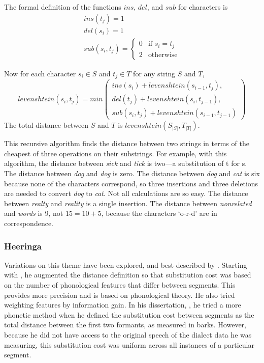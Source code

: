 \documentclass[11pt]{article}
\begin{document}
The formal definition of the functions $ins$, $del$, and $sub$
for characters is
\begin{equation}
\begin{array}{l}
   ins(t_j) = 1 \\
   del(s_i) = 1 \\
   sub(s_i,t_j) = \left\{
     \begin{array}{ll}
       0 & \textrm{if $s_i=t_j$} \\
       2 & \textrm{otherwise}
     \end{array} \right.

   \end{array}
\end{equation}

Now for each character $s_i \in S$ and $t_j \in T$ for any string $S$ and $T$,
\begin{equation}
  levenshtein(s_i,t_j) = min \left(
  \begin{array}{l}
   ins(s_i)+levenshtein(s_{i-1},t_j), \\
 del(t_j)+levenshtein(s_i,t_{j-1}), \\
 sub(s_i,t_j)+levenshtein(s_{i-1},t_{j-1})
   \end{array} \right)
   \label{levequation}
\end{equation}
The total distance between $S$ and $T$ is $levenshtein(S_{|S|},T_{|T|})$.

This recursive algorithm finds the distance between two strings in
terms of the cheapest of three operations on their substrings.
For example, with this algorithm, the distance between \textit{sick} and
\textit{tick} is two---a substitution of t for s. The distance between
\textit{dog} and \textit{dog} is zero. The distance between
\textit{dog} and \textit{cat} is six because none of the characters
correspond, so three insertions and three deletions are needed to
convert \textit{dog} to \textit{cat}. Not all calculations are so
easy. The distance between \textit{realty} and \textit{reality} is a
single insertion. The distance between \textit{nonrelated} and
\textit{words} is 9, not $15 =10 + 5$, because the characters `o-r-d'
are in correspondence.

\subsubsection{Heeringa}
\label{levmethod}
Variations on this theme have been explored, and best described by
. Starting with \cite{nerbonne97}, he augmented
the distance definition so that substitution cost was based on the
number of phonological features that differ between segments. This provides more
precision and is based on phonological theory. He also tried
weighting features by information gain.  In his dissertation,
\cite{heeringa04}, he tried a more phonetic method when he defined the
substitution cost between segments as the total distance between the
first two formants, as measured in barks. However, because he did not
have access to the original speech of the dialect data he was
measuring, this substitution cost was uniform across all instances of
a particular segment.
\end{document}

